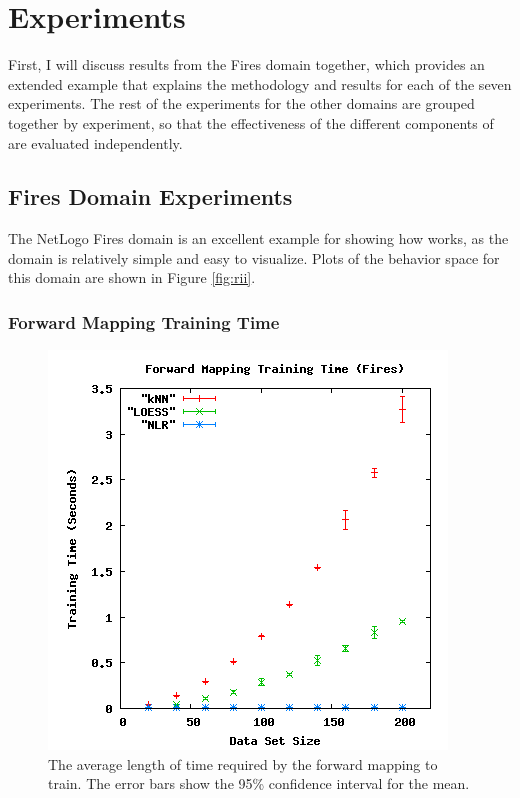 \section{Experiments}\label{sec:exps}

First, I will discuss results from the Fires domain together, which provides an extended example that explains the methodology and results for each of the seven experiments.
The rest of the experiments  for the other domains are grouped together by experiment, so that the effectiveness of the different components of \fw are evaluated independently.

 \subsection{Fires Domain Experiments}

The NetLogo Fires domain is an excellent example for showing how \fw works, as the domain is relatively simple and easy to visualize.
Plots of the behavior space for this domain are shown in Figure \ref{fig:rii}.




\subsubsection{Forward Mapping Training Time}


\begin{figure}[ht]
\centering
\includegraphics[scale=.5]{images/results_fires/fmtraining.png}
\caption{The average length of time required by the forward mapping to train.
The error bars show the 95\% confidence interval for the mean.}
\label{fig:fmtraining}
\end{figure}


